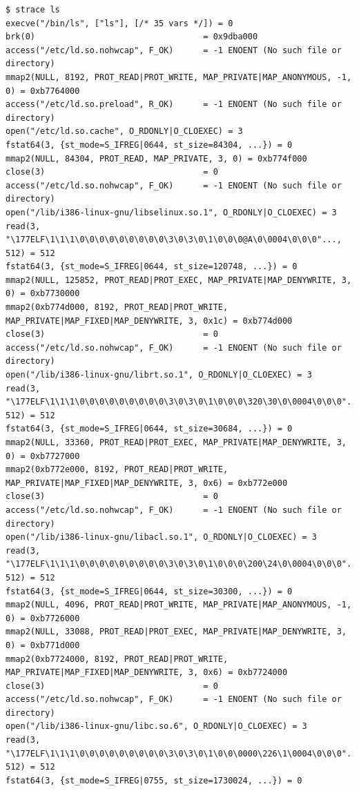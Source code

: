 {\begin{shaded}\begin{verbatim}
$ strace ls
execve("/bin/ls", ["ls"], [/* 35 vars */]) = 0
brk(0)                                  = 0x9dba000
access("/etc/ld.so.nohwcap", F_OK)      = -1 ENOENT (No such file or directory)
mmap2(NULL, 8192, PROT_READ|PROT_WRITE, MAP_PRIVATE|MAP_ANONYMOUS, -1, 0) = 0xb7764000
access("/etc/ld.so.preload", R_OK)      = -1 ENOENT (No such file or directory)
open("/etc/ld.so.cache", O_RDONLY|O_CLOEXEC) = 3
fstat64(3, {st_mode=S_IFREG|0644, st_size=84304, ...}) = 0
mmap2(NULL, 84304, PROT_READ, MAP_PRIVATE, 3, 0) = 0xb774f000
close(3)                                = 0
access("/etc/ld.so.nohwcap", F_OK)      = -1 ENOENT (No such file or directory)
open("/lib/i386-linux-gnu/libselinux.so.1", O_RDONLY|O_CLOEXEC) = 3
read(3, "\177ELF\1\1\1\0\0\0\0\0\0\0\0\0\3\0\3\0\1\0\0\0@A\0\0004\0\0\0"..., 512) = 512
fstat64(3, {st_mode=S_IFREG|0644, st_size=120748, ...}) = 0
mmap2(NULL, 125852, PROT_READ|PROT_EXEC, MAP_PRIVATE|MAP_DENYWRITE, 3, 0) = 0xb7730000
mmap2(0xb774d000, 8192, PROT_READ|PROT_WRITE, MAP_PRIVATE|MAP_FIXED|MAP_DENYWRITE, 3, 0x1c) = 0xb774d000
close(3)                                = 0
access("/etc/ld.so.nohwcap", F_OK)      = -1 ENOENT (No such file or directory)
open("/lib/i386-linux-gnu/librt.so.1", O_RDONLY|O_CLOEXEC) = 3
read(3, "\177ELF\1\1\1\0\0\0\0\0\0\0\0\0\3\0\3\0\1\0\0\0\320\30\0\0004\0\0\0"..., 512) = 512
fstat64(3, {st_mode=S_IFREG|0644, st_size=30684, ...}) = 0
mmap2(NULL, 33360, PROT_READ|PROT_EXEC, MAP_PRIVATE|MAP_DENYWRITE, 3, 0) = 0xb7727000
mmap2(0xb772e000, 8192, PROT_READ|PROT_WRITE, MAP_PRIVATE|MAP_FIXED|MAP_DENYWRITE, 3, 0x6) = 0xb772e000
close(3)                                = 0
access("/etc/ld.so.nohwcap", F_OK)      = -1 ENOENT (No such file or directory)
open("/lib/i386-linux-gnu/libacl.so.1", O_RDONLY|O_CLOEXEC) = 3
read(3, "\177ELF\1\1\1\0\0\0\0\0\0\0\0\0\3\0\3\0\1\0\0\0\200\24\0\0004\0\0\0"..., 512) = 512
fstat64(3, {st_mode=S_IFREG|0644, st_size=30300, ...}) = 0
mmap2(NULL, 4096, PROT_READ|PROT_WRITE, MAP_PRIVATE|MAP_ANONYMOUS, -1, 0) = 0xb7726000
mmap2(NULL, 33088, PROT_READ|PROT_EXEC, MAP_PRIVATE|MAP_DENYWRITE, 3, 0) = 0xb771d000
mmap2(0xb7724000, 8192, PROT_READ|PROT_WRITE, MAP_PRIVATE|MAP_FIXED|MAP_DENYWRITE, 3, 0x6) = 0xb7724000
close(3)                                = 0
access("/etc/ld.so.nohwcap", F_OK)      = -1 ENOENT (No such file or directory)
open("/lib/i386-linux-gnu/libc.so.6", O_RDONLY|O_CLOEXEC) = 3
read(3, "\177ELF\1\1\1\0\0\0\0\0\0\0\0\0\3\0\3\0\1\0\0\0000\226\1\0004\0\0\0"..., 512) = 512
fstat64(3, {st_mode=S_IFREG|0755, st_size=1730024, ...}) = 0

\end{verbatim}
\end{shaded}}
